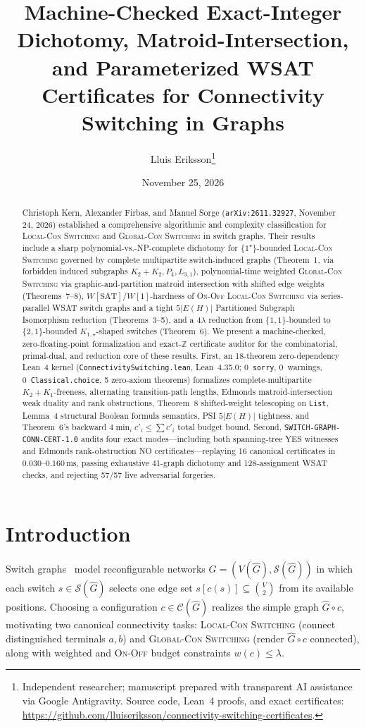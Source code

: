 \documentclass[11pt,twocolumn]{article}
\title{\textbf{Machine-Checked Exact-Integer Dichotomy, Matroid-Intersection, and Parameterized WSAT Certificates for Connectivity Switching in Graphs}}
\author{Lluis Eriksson\thanks{Independent researcher; manuscript prepared with transparent AI assistance via Google Antigravity. Source code, Lean~4 proofs, and exact certificates: \url{https://github.com/lluiseriksson/connectivity-switching-certificates}.}}
\date{November 25, 2026}
\newcommand{\ZZ}{\mathbb{Z}}
\begin{document}
\maketitle

\begin{abstract}
Christoph Kern, Alexander Firbas, and Manuel Sorge (\texttt{arXiv:2611.32927}, November 24, 2026) established a comprehensive algorithmic and complexity classification for \textsc{Local-Con Switching} and \textsc{Global-Con Switching} in switch graphs. Their results include a sharp polynomial-vs.-NP-complete dichotomy for $\{1^\star\}$-bounded \textsc{Local-Con Switching} governed by complete multipartite switch-induced graphs (Theorem~1, via forbidden induced subgraphs $K_2{+}K_2, P_4, L_{3,1}$), polynomial-time weighted \textsc{Global-Con Switching} via graphic-and-partition matroid intersection with shifted edge weights (Theorems~7--8), $W[\mathrm{SAT}]$/$W[1]$-hardness of \textsc{On-Off Local-Con Switching} via series-parallel WSAT switch graphs and a tight $5|E(H)|$ Partitioned Subgraph Isomorphism reduction (Theorems~3--5), and a $4\lambda$ reduction from $\{1,1\}$-bounded to $\{2,1\}$-bounded $K_{1,\star}$-shaped switches (Theorem~6). We present a machine-checked, zero-floating-point formalization and exact-$\ZZ$ certificate auditor for the combinatorial, primal-dual, and reduction core of these results. First, an 18-theorem zero-dependency Lean~4 kernel (\texttt{ConnectivitySwitching.lean}, Lean~4.35.0; 0~\texttt{sorry}, 0~warnings, 0~\texttt{Classical.choice}, 5 zero-axiom theorems) formalizes complete-multipartite $K_2{+}K_1$-freeness, alternating transition-path lengths, Edmonds matroid-intersection weak duality and rank obstructions, Theorem~8 shifted-weight telescoping on \texttt{List}, Lemma~4 structural Boolean formula semantics, PSI $5|E(H)|$ tightness, and Theorem~6's backward $4\min_i c'_i \le \sum c'_i$ total budget bound. Second, \texttt{SWITCH-GRAPH-CONN-CERT-1.0} audits four exact modes—including both spanning-tree YES witnesses and Edmonds rank-obstruction NO certificates—replaying 16 canonical certificates in $0.030$--$0.160\,\mathrm{ms}$, passing exhaustive 41-graph dichotomy and 128-assignment WSAT checks, and rejecting 57/57 live adversarial forgeries.
\end{abstract}

\section{Introduction}
Switch graphs~\cite{katz2011connectivity,kern2026switching} model reconfigurable networks $\hat{G} = (V(\hat{G}), \mathcal{S}(\hat{G}))$ in which each switch $s \in \mathcal{S}(\hat{G})$ selects one edge set $s[c(s)] \subseteq \binom{V}{2}$ from its available positions. Choosing a configuration $c \in \mathcal{C}(\hat{G})$ realizes the simple graph $\hat{G} \circ c$, motivating two canonical connectivity tasks: \textsc{Local-Con Switching} (connect distinguished terminals $a, b$) and \textsc{Global-Con Switching} (render $\hat{G} \circ c$ connected), along with weighted and \textsc{On-Off} budget constraints $w(c) \le \lambda$.
\end{document}
